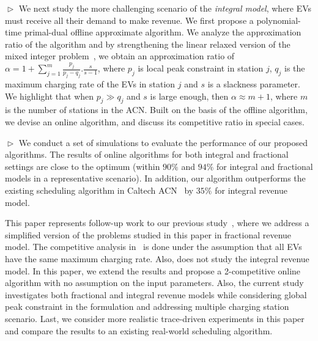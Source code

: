 \documentclass[journal]{IEEEtran}
\newcommand{\bt}[1]{{\color{blue}#1}}%
\newcommand{\rev}[1]{{\color{black}#1}}%
\newcommand{\bt}[1]{#1}
\newcommand{\rev}[1]{#1}
\begin{document}
$\vartriangleright$ We next study \rev{the} more challenging scenario of \rev{the} \textit{integral model}\rev{, }where EVs must receive all their demand to make revenue. We first propose a polynomial-time primal-dual offline approximate algorithm. We analyze the approximation ratio of the algorithm and by strengthening the linear relaxed version of the mixed integer problem~\cite{Carr}, we obtain an approximation ratio of $\alpha =1+\sum_{j=1}^m {\frac{p_j}{p_j-q_j}}.\frac{s}{s-1}$, where $p_j$ is local peak constraint in station $j$, $q_j$ is the maximum charging rate of the EVs in station $j$ and $s$ is a slackness parameter. We highlight that when $p_j \gg q_j$ and $s$ is \rev{large} enough, then $\alpha \approx m+1$, where $m$ is the number of stations in the ACN. Built on the basis of the offline algorithm, we devise an online algorithm, and discuss its competitive ratio in special cases. 

$\vartriangleright$ We conduct a set of  simulations to evaluate the performance of our proposed algorithms. 
The results of online algorithms for both integral and fractional settings are close to the optimum (within $90\%$ and $94\%$ for integral and fractional models in a representative scenario). In addition, our algorithm outperforms the existing scheduling algorithm in Caltech ACN~\cite{lee2016adaptive} by $35\%$ for integral revenue model.

\bt{This paper represents follow-up work to our previous study~\cite{alinia2018competitive}, where we address a simplified version of the problems studied in this paper in fractional revenue model. The competitive analysis in~\cite{alinia2018competitive} is done under the assumption that all EVs have the same maximum charging rate. Also, \cite{alinia2018competitive} does not study the integral revenue model. In this paper, we extend the results and propose a 2-competitive online algorithm with no assumption on the input parameters. Also, the current study investigates both fractional and integral revenue models while considering global peak constraint in the formulation and addressing multiple charging station scenario. Last, we consider more realistic trace-driven experiments in this paper and compare the results to an existing real-world scheduling algorithm.}
\end{document}
